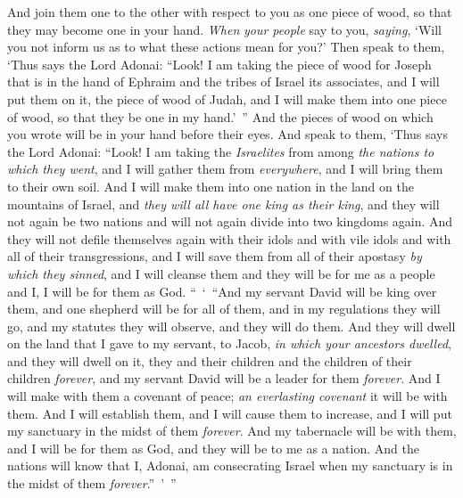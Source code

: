 \begin{biblechapter}
\verse And join them one to the other with respect to you as one piece of wood, so that they may become one in your hand.
\verse \textit{When} \textit{your people} say to you, \textit{saying}, ‘Will you not inform us as to what these actions mean for you?’
\verse Then speak to them, ‘Thus says the Lord Adonai: “Look! I am taking the piece of wood for Joseph that is in the hand of Ephraim and the tribes of Israel its associates, and I will put them on it, the piece of wood of Judah, and I will make them into one piece of wood, so that they be one in my hand.’ ”
\verse And the pieces of wood on which you wrote will be in your hand before their eyes.
\verse And speak to them, ‘Thus says the Lord Adonai: “Look! I am taking the \textit{Israelites} from among \textit{the nations to which they went}, and I will gather them from \textit{everywhere}, and I will bring them to their own soil.
\verse And I will make them into one nation in the land on the mountains of Israel, and \textit{they will all have one king as their king}, and they will not again be two nations and will not again divide into two kingdoms again.
\verse And they will not defile themselves again with their idols and with vile idols and with all of their transgressions, and I will save them from all of their apostasy \textit{by which they sinned}, and I will cleanse them and they will be for me as a people and I, I will be for them as God.
\verse “ ‘ “And my servant David will be king over them, and one shepherd will be for all of them, and in my regulations they will go, and my statutes they will observe, and they will do them.
\verse And they will dwell on the land that I gave to my servant, to Jacob, \textit{in which your ancestors dwelled}, and they will dwell on it, they and their children and the children of their children \textit{forever}, and my servant David will be a leader for them \textit{forever}.
\verse And I will make with them a covenant of peace; \textit{an everlasting covenant} it will be with them. And I will establish them, and I will cause them to increase, and I will put my sanctuary in the midst of them \textit{forever}.
\verse And my tabernacle will be with them, and I will be for them as God, and they will be to me as a nation.
\verse And the nations will know that I, Adonai, am consecrating Israel when my sanctuary is in the midst of them \textit{forever}.” ’ ”
\end{biblechapter}

